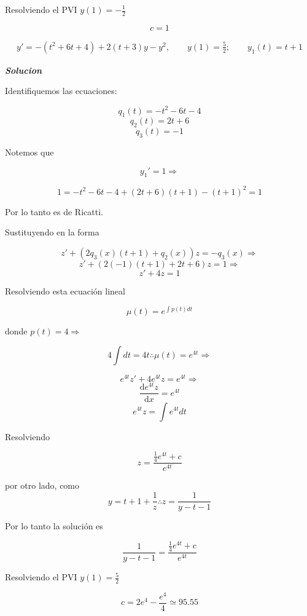 Resolviendo el PVI $y(1)=-\frac{1}{2}$

$$c=1$$

\begin{align*}
    y'= - (t^{2}+6t+4)+2(t+3)y-y^{2}, \qquad y(1)= \frac{5}{2}; \qquad y_{1}(t)=t+1
\end{align*}

\textit{ \textbf{Solucion}}

Identifiquemos las ecuaciones:

$$q_1(t)=-t^{2}-6t-4$$
$$q_2(t)=2t+6$$
$$q_3(t)=-1$$

Notemos que

$$y_{1}'= 1 \Rightarrow $$  

$$1=-t^{2}-6t-4+(2t+6)(t+1)-(t+1)^{2}=1 $$ 

Por lo tanto es de Ricatti.


Sustituyendo en la forma

$$z'+(2q_3(x)(t+1)+q_2(x))z=-q_3(x) \Rightarrow$$
$$z'+(2(-1)(t+1)+2t+6)z=1 \Rightarrow$$
$$z'+4z=1$$

Resolviendo esta ecuación lineal

$$\mu(t)=e^{\int p(t)dt}$$

donde $p(t)=4 \Rightarrow$

$$4\int dt = 4t \therefore \mu(t)=e^{4t} \Rightarrow$$

$$e^{4t}z'+4e^{4t}z=e^{4t} \Rightarrow$$
$$\frac{\mathrm{d} e^{4t}z}{\mathrm{d} x}=e^{4t}$$
$$e^{4t}z=\int e^{4t} dt$$

Resolviendo

$$z=\frac{\frac{1}{4}e^{4t}+c}{e^{4t}}$$

por otro lado, como $$y=t+1+\frac{1}{z} \therefore z=\frac{1}{y-t-1}$$

Por lo tanto la solución es

$$\frac{1}{y-t-1}=\frac{\frac{1}{4}e^{4t}+c}{e^{4t}}$$

Resolviendo el PVI $y(1)=\frac{5}{2}$

$$c=2e^{4}-\frac{e^{4}}{4}\simeq 95.55$$


